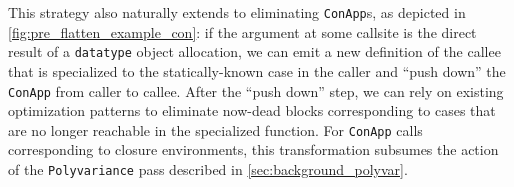 









This strategy also naturally extends to eliminating \texttt{ConApp}s, as
depicted in \cref{fig:pre_flatten_example_con}: if the argument at some callsite
is the direct result of a \texttt{datatype} object allocation, we can emit a
new definition of the callee that is specialized to the statically-known case in
the caller and ``push down'' the \texttt{ConApp} from caller to callee. After
the ``push down'' step, we can rely on existing optimization patterns to
eliminate now-dead blocks corresponding to cases that are no longer reachable in
the specialized function. For \texttt{ConApp} calls corresponding to closure
environments, this transformation subsumes the action of
the \texttt{Polyvariance} pass described in \cref{sec:background_polyvar}.

